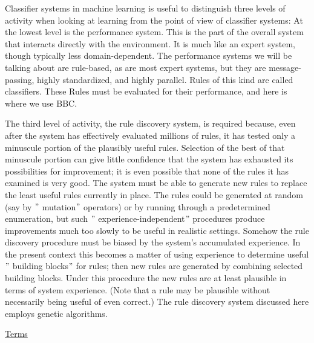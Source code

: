 \documentclass[12pt]{article}
\renewcommand{\_}{\kern-1.5pt\textunderscore\kern-1.5pt}
\begin{document}
Classifier systems in machine learning is useful to distinguish three levels of activity when looking at learning from the point of view of classifier systems: At the lowest level is the performance system. This is the part of the overall system that interacts directly with the environment. It is much like an expert system, though typically less domain-dependent. The performance systems we will be talking about are rule-based, as are most expert systems, but they are message-passing, highly standardized, and highly parallel. Rules of this kind are called classifiers. These Rules must be evaluated for their performance, and here is where we use BBC.\par

The third level of activity, the rule discovery system, is required because, even after the system has effectively evaluated millions of rules, it has tested only a minuscule portion of the plausibly useful rules. Selection of the best of that minuscule portion can give little confidence that the system has exhausted its possibilities for improvement; it is even possible that none of the rules it has examined is very good. The system must be able to generate new rules to replace the least useful rules currently in place. The rules could be generated at random (say by $"$ mutation$"$  operators) or by running through a predetermined enumeration, but such $"$ experience-independent$"$  procedures produce improvements much too slowly to be useful in realistic settings. Somehow the rule discovery procedure must be biased by the system’s accumulated experience. In the present context this becomes a matter of using experience to determine useful $"$ building blocks$"$  for rules; then new rules are generated by combining selected building blocks. Under this procedure the new rules are at least plausible in terms of system experience. (Note that a rule may be plausible without necessarily being useful of even correct.) The rule discovery system discussed here employs genetic algorithms.\par

{\fontsize{14pt}{16.8pt}\selectfont \uline{Terms}\par}\par
\end{document}
